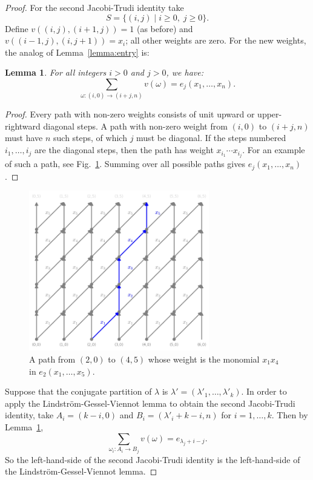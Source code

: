 \documentclass[11pt]{amsart}
\newtheorem{lemma}[theorem]{Lemma}
\theoremstyle{definition}
\theoremstyle{example}
\begin{document}
\begin{proof}
  For the second Jacobi-Trudi identity take
  \begin{displaymath}
    S = \{(i,j)\mid i\geq 0,\;j\geq 0\}.
  \end{displaymath}
  Define $v((i,j),(i+1,j))=1$ (as before) and $v((i-1,j),(i,j+1))=x_i$; all other weights are zero.
  For the new weights, the analog of Lemma~\ref{lemma:entry} is:
  \begin{lemma}
    \label{lemma:entry-e}
    For all integers $i>0$ and $j>0$, we have:
    \begin{displaymath}
      \sum_{\omega:(i,0)\to (i+j,n)} v(\omega) = e_j(x_1,\dotsc,x_n).
    \end{displaymath}
  \end{lemma}
  \begin{proof}
    Every path with non-zero weights consists of unit upward or upper-rightward diagonal steps.
    A path with non-zero weight from $(i,0)$ to $(i+j,n)$ must have $n$ such steps, of which $j$ must be diagonal.
    If the steps numbered $i_1,\dotsc,i_j$ are the diagonal steps, then the path has weight $x_{i_1}\dotsb x_{i_j}$.
    For an example of such a path, see Fig.~\ref{fig:example_path_e}.
    Summing over all possible paths gives $e_j(x_1,\dotsc,x_n)$.
  \end{proof}
  \begin{figure}
    \centering
    \includegraphics[width=0.7\textwidth]{path_example2.png}
    \caption{A path from $(2,0)$ to $(4,5)$ whose weight is the monomial $x_1x_4$ in $e_2(x_1,\dotsc,x_5)$.}
    \label{fig:example_path_e}
  \end{figure}
  Suppose that the conjugate partition of $\lambda$ is $\lambda'=(\lambda'_1,\dotsc,\lambda'_k)$.
  In order to apply the Lindstr\"om-Gessel-Viennot lemma to obtain the second Jacobi-Trudi identity, take $A_i=(k-i, 0)$ and $B_i=(\lambda'_i+k-i, n)$ for $i=1,\dotsc,k$.
  Then by Lemma~\ref{lemma:entry-e},
  \begin{displaymath}
    \sum_{\omega_i:A_i\to B_j} v(\omega) = e_{\lambda_j+i-j}.
  \end{displaymath}
  So the left-hand-side of the second Jacobi-Trudi identity is the left-hand-side of the Lindstr\"om-Gessel-Viennot lemma.


\end{proof}
\end{document}
